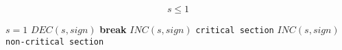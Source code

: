 \documentclass{article}
\begin{document}
\begin{displaymath}
    s \leq 1
\end{displaymath}
\begin{algorithmic}
    \State $ s = 1 $
    \State {}
                \State $ DEC(s, sign) $
                    \State \textbf{break}
                \EndIf
                \State $ INC(s, sign) $
            \EndWhile
            \State \texttt{critical section}
            \State $ INC(s, sign) $
            \State \texttt{non-critical section}
        \EndWhile
    \EndProcedure
\end{algorithmic}
\end{document}
